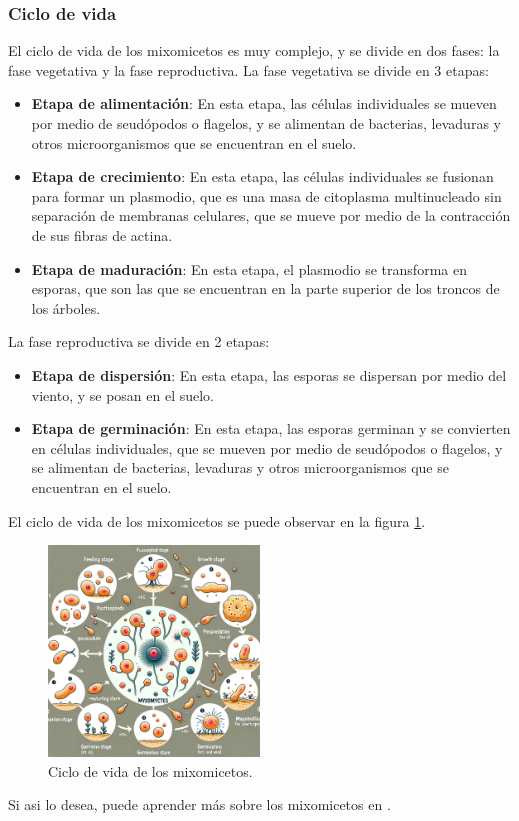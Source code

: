 \subsubsection{Ciclo de vida}
    El ciclo de vida de los mixomicetos es muy complejo, y se divide en dos fases: 
        la fase vegetativa y la fase reproductiva.
    \vskip 0.5cm
    La fase vegetativa se divide en 3 etapas:
    \begin{itemize}
        \item \textbf{Etapa de alimentaci\'on}: En esta etapa, las c\'elulas individuales 
            se mueven por medio de seud\'opodos o flagelos, y se alimentan de bacterias, 
            levaduras y otros microorganismos que se encuentran en el suelo.
        \item \textbf{Etapa de crecimiento}: En esta etapa, las c\'elulas individuales 
            se fusionan para formar un plasmodio, que es una masa de citoplasma multinucleado 
            sin separaci\'on de membranas celulares, que se mueve por medio de la contracci\'on 
            de sus fibras de actina.
        \item \textbf{Etapa de maduraci\'on}: En esta etapa, el plasmodio se transforma en 
            esporas, que son las que se encuentran en la parte superior de los troncos de los \'arboles.
    \end{itemize}
    \vskip 0.5cm
    La fase reproductiva se divide en 2 etapas:
    \begin{itemize}
        \item \textbf{Etapa de dispersi\'on}: En esta etapa, las esporas se dispersan por 
            medio del viento, y se posan en el suelo.
        \item \textbf{Etapa de germinaci\'on}: En esta etapa, las esporas germinan y se 
            convierten en c\'elulas individuales, que se mueven por medio de seud\'opodos 
            o flagelos, y se alimentan de bacterias, levaduras y otros microorganismos 
            que se encuentran en el suelo.
    \end{itemize}
    \vskip 0.5cm
    El ciclo de vida de los mixomicetos se puede observar en la figura \ref{fig:MixomicetoCicloVida}.
    \begin{figure}[h]
        \centering
        \includegraphics[width=0.5\textwidth]{./images/marco_teorico/Physarum/mixomiceto_ciclo_vida.png}
        \caption{Ciclo de vida de los mixomicetos.}
        \label{fig:MixomicetoCicloVida}
    \end{figure}
    \vskip 0.5cm
    Si asi lo desea, puede aprender m\'as sobre los mixomicetos en \cite{Rojas2017}.
    \vskip 0.5cm